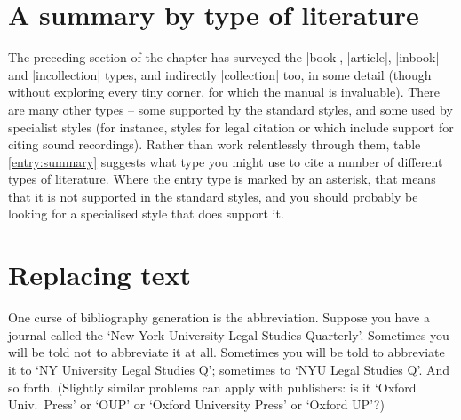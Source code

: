 {\section{A summary by type of literature}

The preceding section of the chapter has surveyed the |book|, |article|, |inbook| and |incollection| types, and indirectly |collection| too, in some detail (though without exploring every tiny corner, for which the manual is invaluable). There are many other types -- some supported by the standard styles, and some used by specialist styles (for instance, styles for legal citation or which include support for citing sound recordings). Rather than work relentlessly through them, table \ref{entry:summary} suggests what type you might use to cite a number of different types of literature. Where the entry type is marked by an asterisk, that means that it is not supported in the standard styles, and you should probably be looking for a specialised style that does support it.


\section{Replacing text}

One curse of bibliography generation is the abbreviation. Suppose you have a journal called the `New York University Legal Studies Quarterly'. Sometimes you will be told not to abbreviate it at all. Sometimes you will be told to abbreviate it to `NY University Legal Studies Q'; sometimes to `NYU Legal Studies Q'. And so forth. (Slightly similar problems can apply with publishers: is it `Oxford Univ.\ Press' or `OUP' or `Oxford University Press' or `Oxford UP'?)

}
